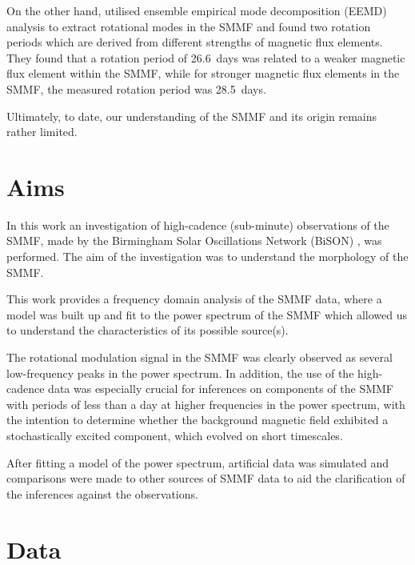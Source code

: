 On the other hand, \citet{xiang_ensemble_2016} utilised ensemble empirical mode decomposition (EEMD) analysis to extract rotational modes in the SMMF and found two rotation periods which are derived from different strengths of magnetic flux elements. They found that a rotation period of 26.6~days was related to a weaker magnetic flux element within the SMMF, while for stronger magnetic flux elements in the SMMF, the measured rotation period was 28.5~days.

Ultimately, to date, our understanding of the SMMF and its origin remains rather limited.




\section{Aims}\label{sec:SMMF_aims}

In this work an investigation of high-cadence (sub-minute) observations of the SMMF, made by the Birmingham Solar Oscillations Network (BiSON) \citep{chaplin_bison_1996, chaplin_noise_2005, hale_performance_2016}, was performed. The aim of the investigation was to understand the morphology of the SMMF. 

This work provides a frequency domain analysis of the SMMF data, where a model was built up and fit to the power spectrum of the SMMF which allowed us to understand the characteristics of its possible source(s). 

The rotational modulation signal in the SMMF was clearly observed as several low-frequency peaks in the power spectrum. In addition, the use of the high-cadence data was especially crucial for inferences on components of the SMMF with periods of less than a day at higher frequencies in the power spectrum, with the intention to determine whether the background magnetic field exhibited a stochastically excited component, which evolved on short timescales.

After fitting a model of the power spectrum, artificial data was simulated and comparisons were made to other sources of SMMF data to aid the clarification of the inferences against the observations.



\section{Data}\label{sec:SMMF_data}



